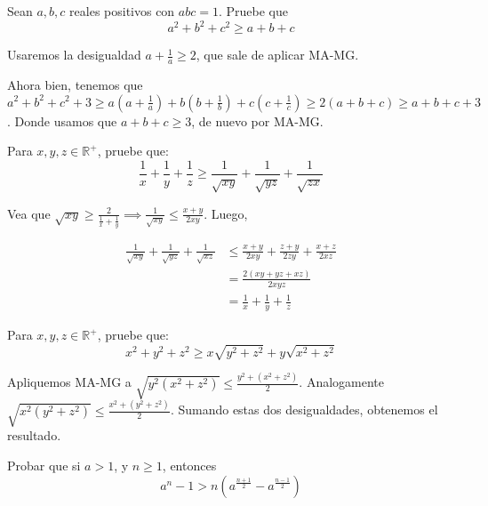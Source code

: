 \begin{ejer}
	Sean $a,b, c$ reales positivos con $abc = 1$. Pruebe que 
	\begin{equation}
	    a^2+b^2+c^2\geq a+b+c
	\end{equation}
\end{ejer}

\begin{sol}
	Usaremos la desigualdad $a + \frac{1}{a} \geq 2$, que sale de aplicar MA-MG. 
	
	Ahora bien, tenemos que $a^{2} + b^{2} + c^{2} + 3\geq a(a+\frac{1}{a}) + b(b+\frac{1}{b}) + c(c+ \frac{1}{c}) \geq 2(a+b+c) \geq a+b+c +3$. Donde usamos que $a+b+c \geq 3$, de nuevo por MA-MG. 
\end{sol}
\begin{ejer}
	Para $x, y, z \in \mathbb{R}^{+}$, pruebe que:
	\begin{equation}
	\frac{1}{x} + \frac{1}{y} + \frac{1}{z} \geq \frac{1}{\sqrt{xy}} + \frac{1}{\sqrt{yz}} + \frac{1}{\sqrt{zx}}
	\end{equation}
\end{ejer}
\begin{sol}
	Vea que $\sqrt{xy} \geq \frac{2}{\frac{1}{x}+\frac{1}{y}} \implies \frac{1}{\sqrt{xy}} \leq \frac{x+y}{2xy}$. Luego,
	
	\begin{align}
	\frac{1}{\sqrt{xy}} + \frac{1}{\sqrt{yz}} + \frac{1}{\sqrt{xz}} &\leq \frac{x+y}{2xy} + \frac{z+y}{2zy} + \frac{x+z}{2xz} \\
	& = \frac{2(xy + yz +xz)}{2xyz} \\
	& = \frac{1}{x} + \frac{1}{y} + \frac{1}{z}
	\end{align}
\end{sol}

\begin{ejer}
	Para $x, y, z \in \mathbb{R}^{+}$, pruebe que:
	\begin{equation}
	x^2+y^2+z^2\geq x\sqrt{y^2+z^2}+y\sqrt{x^2+z^2 }
	\end{equation}
\end{ejer}
\begin{sol}
	Apliquemos MA-MG a $\sqrt{y^2(x^2+z^2)} \leq \frac{ y^2 + (x^2+z^2)}{2}$. Analogamente $\sqrt{x^2(y^2+z^2)} \leq \frac{ x^2 + (y^2+z^2)}{2}$. Sumando estas dos desigualdades, obtenemos el resultado.
\end{sol}

\begin{ejer}
	Probar que si $a>1$, y $n\geq 1$, entonces 
	\begin{equation}
	a^{n} - 1 > n \left(a^{\frac{n+1}{2}} - a^{\frac{n-1}{2}}\right)
	\end{equation}
\end{ejer}


